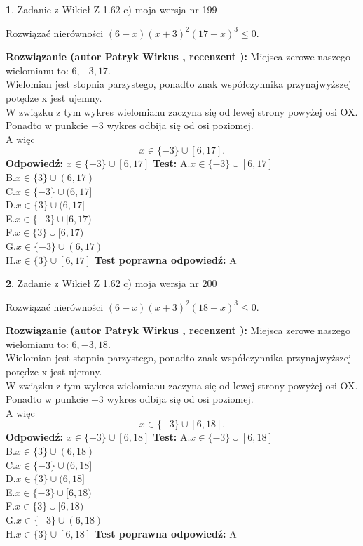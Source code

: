 \documentclass[12pt, a4paper]{article}
\theoremstyle{definition} %
\newtheorem{zad}{}
\newcommand{\zadStart}[1]{\begin{zad}#1\newline}
\newcommand{\zadStop}{\end{zad}}
\newcommand{\rozwStart}[2]{\noindent \textbf{Rozwiązanie (autor #1 , recenzent #2): }\newline}
\newcommand{\rozwStop}{\newline}
\newcommand{\odpStart}{\noindent \textbf{Odpowiedź:}\newline}
\newcommand{\odpStop}{\newline}
\newcommand{\testStart}{\noindent \textbf{Test:}\newline}
\newcommand{\testStop}{\newline}
\newcommand{\kluczStart}{\noindent \textbf{Test poprawna odpowiedź:}\newline}
\newcommand{\kluczStop}{\newline}
\begin{document}
\zadStart{Zadanie z Wikieł Z 1.62 c) moja wersja nr 199}

Rozwiązać nierówności $(6-x)(x+3)^{2}(17-x)^{3}\le0$.
\zadStop
\rozwStart{Patryk Wirkus}{}
Miejsca zerowe naszego wielomianu to: $6, -3, 17$.\\
Wielomian jest stopnia parzystego, ponadto znak współczynnika przy\linebreak najwyższej potędze x jest ujemny.\\ W związku z tym wykres wielomianu zaczyna się od lewej strony powyżej osi OX.\\
Ponadto w punkcie $-3$ wykres odbija się od osi poziomej.\\
A więc $$x \in \{-3\} \cup [6,17].$$
\rozwStop
\odpStart
$x \in \{-3\} \cup [6,17]$
\odpStop
\testStart
A.$x \in \{-3\} \cup [6,17]$\\
B.$x \in \{3\} \cup (6,17)$\\
C.$x \in \{-3\} \cup (6,17]$\\
D.$x \in \{3\} \cup (6,17]$\\
E.$x \in \{-3\} \cup [6,17)$\\
F.$x \in \{3\} \cup [6,17)$\\
G.$x \in \{-3\} \cup (6,17)$\\
H.$x \in \{3\} \cup [6,17]$
\testStop
\kluczStart
A
\kluczStop



\zadStart{Zadanie z Wikieł Z 1.62 c) moja wersja nr 200}

Rozwiązać nierówności $(6-x)(x+3)^{2}(18-x)^{3}\le0$.
\zadStop
\rozwStart{Patryk Wirkus}{}
Miejsca zerowe naszego wielomianu to: $6, -3, 18$.\\
Wielomian jest stopnia parzystego, ponadto znak współczynnika przy\linebreak najwyższej potędze x jest ujemny.\\ W związku z tym wykres wielomianu zaczyna się od lewej strony powyżej osi OX.\\
Ponadto w punkcie $-3$ wykres odbija się od osi poziomej.\\
A więc $$x \in \{-3\} \cup [6,18].$$
\rozwStop
\odpStart
$x \in \{-3\} \cup [6,18]$
\odpStop
\testStart
A.$x \in \{-3\} \cup [6,18]$\\
B.$x \in \{3\} \cup (6,18)$\\
C.$x \in \{-3\} \cup (6,18]$\\
D.$x \in \{3\} \cup (6,18]$\\
E.$x \in \{-3\} \cup [6,18)$\\
F.$x \in \{3\} \cup [6,18)$\\
G.$x \in \{-3\} \cup (6,18)$\\
H.$x \in \{3\} \cup [6,18]$
\testStop
\kluczStart
A
\kluczStop
\end{document}
